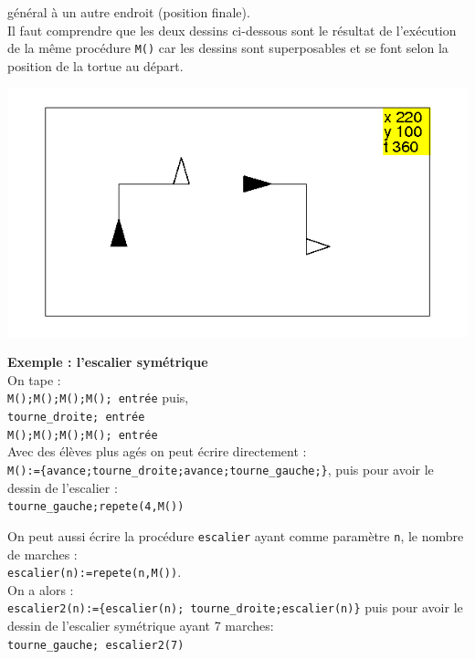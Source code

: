 \documentclass[a4paper,11pt]{book}
\begin{document}
g\'en\'eral \`a un autre endroit (position finale).\\
Il faut comprendre que les deux dessins ci-dessous sont le r\'esultat de 
l'ex\'ecution de la m\^eme proc\'edure {\tt M()} car les dessins sont 
superposables et se font selon la position de la tortue au d\'epart.
\begin{center}\includegraphics[width=\textwidth]{tortuem2}\end{center}

{\bf Exemple : l'escalier sym\'etrique}\\
On tape :\\
{\tt M();M();M();M(); entr\'ee} puis,\\
{\tt tourne\_droite; entr\'ee}\\
{\tt M();M();M();M(); entr\'ee}\\
Avec des \'el\`eves plus ag\'es on peut \'ecrire directement :\\
{\tt M():=\{avance;tourne\_droite;avance;tourne\_gauche;\}},
puis pour avoir le dessin de l'escalier :\\
{\tt tourne\_gauche;repete(4,M())}

On peut aussi \'ecrire la proc\'edure {\tt escalier} ayant comme param\`etre
{\tt n}, le nombre de marches :\\
{\tt escalier(n):=repete(n,M())}.\\
On a alors :\\
{\tt escalier2(n):=\{escalier(n); tourne\_droite;escalier(n)\}}
puis pour avoir le dessin de l'escalier sym\'etrique ayant 7 marches:\\
{\tt tourne\_gauche; escalier2(7)}
\end{document}
